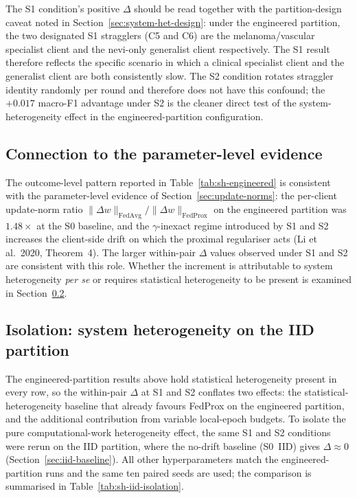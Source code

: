 \documentclass[11pt,a4paper]{report}
\begin{document}
The S1 condition's positive $\Delta$ should be read together
with the partition-design caveat noted in
Section~\ref{sec:system-het-design}: under the engineered
partition, the two designated S1 stragglers (C5 and C6) are
the melanoma/vascular specialist client and the nevi-only
generalist client respectively. The S1 result therefore
reflects the specific scenario in which a clinical specialist
client and the generalist client are both consistently slow.
The S2 condition rotates straggler identity randomly per
round and therefore does not have this confound; the $+0.017$
macro-F1 advantage under S2 is the cleaner direct test of the
system-heterogeneity effect in the engineered-partition
configuration.

\subsection{Connection to the parameter-level evidence}
\label{sec:sh-engineered-connection}

The outcome-level pattern reported in
Table~\ref{tab:sh-engineered} is consistent with the
parameter-level evidence of Section~\ref{sec:update-norms}: the
per-client update-norm ratio $\lVert \Delta w \rVert_{\mathrm{FedAvg}} /
\lVert \Delta w \rVert_{\mathrm{FedProx}}$ on the engineered
partition was $1.48\times$ at the S0 baseline, and the
$\gamma$-inexact regime introduced by S1 and S2 increases the
client-side drift on which the proximal regulariser acts
(Li et al.\ 2020, Theorem~4). The larger within-pair $\Delta$
values observed under S1 and S2 are consistent with this role.
Whether the increment is attributable to system heterogeneity
\emph{per se} or requires statistical heterogeneity to be
present is examined in Section~\ref{sec:sh-iid-isolation}.

\subsection{Isolation: system heterogeneity on the IID partition}
\label{sec:sh-iid-isolation}

The engineered-partition results above hold statistical
heterogeneity present in every row, so the within-pair
$\Delta$ at S1 and S2 conflates two effects: the
statistical-heterogeneity baseline that already favours FedProx
on the engineered partition, and the additional contribution
from variable local-epoch budgets. To isolate the
pure computational-work heterogeneity effect, the same S1 and S2
conditions were rerun on the IID partition, where the
no-drift baseline (S0~IID) gives $\Delta \approx 0$
(Section~\ref{sec:iid-baseline}). All other hyperparameters
match the engineered-partition runs and the same ten paired
seeds are used; the comparison is summarised in
Table~\ref{tab:sh-iid-isolation}.
\end{document}
